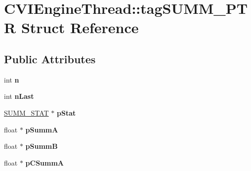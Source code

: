 \hypertarget{struct_c_v_i_engine_thread_1_1tag_s_u_m_m___p_t_r}{\section{C\+V\+I\+Engine\+Thread\+:\+:tag\+S\+U\+M\+M\+\_\+\+P\+T\+R Struct Reference}
\label{struct_c_v_i_engine_thread_1_1tag_s_u_m_m___p_t_r}
}
\subsection*{Public Attributes}
\begin{DoxyCompactItemize}
\item 
\hypertarget{struct_c_v_i_engine_thread_1_1tag_s_u_m_m___p_t_r_ac647af24f7a8fd2e62d4bdc12f4b7465}{int {\bfseries n}}\label{struct_c_v_i_engine_thread_1_1tag_s_u_m_m___p_t_r_ac647af24f7a8fd2e62d4bdc12f4b7465}

\item 
\hypertarget{struct_c_v_i_engine_thread_1_1tag_s_u_m_m___p_t_r_a8091fef3aa3c1fc0f290a6a37c8183f0}{int {\bfseries n\+Last}}\label{struct_c_v_i_engine_thread_1_1tag_s_u_m_m___p_t_r_a8091fef3aa3c1fc0f290a6a37c8183f0}

\item 
\hypertarget{struct_c_v_i_engine_thread_1_1tag_s_u_m_m___p_t_r_a6191d3122464142f39ce9f4915bab62d}{\hyperlink{class_s_u_m_m___s_t_a_t}{S\+U\+M\+M\+\_\+\+S\+T\+A\+T} $\ast$ {\bfseries p\+Stat}}\label{struct_c_v_i_engine_thread_1_1tag_s_u_m_m___p_t_r_a6191d3122464142f39ce9f4915bab62d}

\item 
\hypertarget{struct_c_v_i_engine_thread_1_1tag_s_u_m_m___p_t_r_a126884c9b05358fd2bbcf2dbde7c242a}{float $\ast$ {\bfseries p\+Summ\+A}}\label{struct_c_v_i_engine_thread_1_1tag_s_u_m_m___p_t_r_a126884c9b05358fd2bbcf2dbde7c242a}

\item 
\hypertarget{struct_c_v_i_engine_thread_1_1tag_s_u_m_m___p_t_r_a3ab7ca61e3ade712b4237db5895d8a88}{float $\ast$ {\bfseries p\+Summ\+B}}\label{struct_c_v_i_engine_thread_1_1tag_s_u_m_m___p_t_r_a3ab7ca61e3ade712b4237db5895d8a88}

\item 
\hypertarget{struct_c_v_i_engine_thread_1_1tag_s_u_m_m___p_t_r_a871f6a62c19fe2662b61acef3c5e1f0b}{float $\ast$ {\bfseries p\+C\+Summ\+A}}\label{struct_c_v_i_engine_thread_1_1tag_s_u_m_m___p_t_r_a871f6a62c19fe2662b61acef3c5e1f0b}


\end{DoxyCompactItemize}
